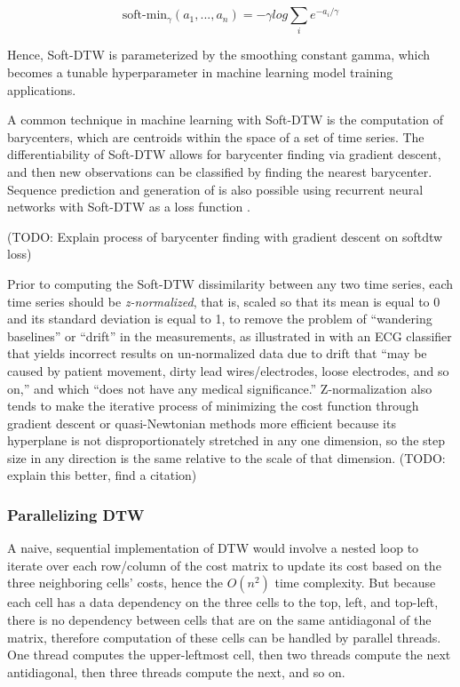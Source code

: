 \documentclass[12pt, letterpaper]{article}
\begin{document}
\begin{equation} \label{softdtw}
\text{soft-min}_\gamma(a_1,...,a_n) = -\gamma log\sum_{i}e^{-a_i/\gamma}
\end{equation}

Hence, Soft-DTW is parameterized by the smoothing constant gamma, which becomes
a tunable hyperparameter in machine learning model training applications.

A common technique in machine learning with Soft-DTW is the computation of
barycenters, which are centroids within the space of a set of time series. The
differentiability of Soft-DTW allows for barycenter finding via gradient
descent, and then new observations can be classified by finding the nearest
barycenter. Sequence prediction and generation of is also possible using
recurrent neural networks with Soft-DTW as a loss function
\cite{cuturi_soft-dtw_2018}.

(TODO: Explain process of barycenter finding with gradient descent on softdtw
loss)

Prior to computing the Soft-DTW dissimilarity between any two time series, each
time series should be \emph{z-normalized}, that is, scaled so that its mean is
equal to 0 and its standard deviation is equal to 1, to remove the problem of
``wandering baselines'' or ``drift'' in the measurements, as illustrated in
\cite{rakthanmanon_addressing_2013} with an ECG classifier that yields incorrect
results on un-normalized data due to drift that ``may be caused by patient
movement, dirty lead wires/electrodes, loose electrodes, and so on,'' and which
``does not have any medical significance.'' Z-normalization also tends to make
the iterative process of minimizing the cost function through gradient descent
or quasi-Newtonian methods more efficient because its hyperplane is not
disproportionately stretched in any one dimension, so the step size in any
direction is the same relative to the scale of that dimension. (TODO: explain
this better, find a citation)

\subsubsection{Parallelizing DTW}

A naive, sequential implementation of DTW would involve a nested loop to iterate
over each row/column of the cost matrix to update its cost based on the three
neighboring cells' costs, hence the $O(n^2)$ time complexity. But because each
cell has a data dependency on the three cells to the top, left, and top-left,
there is no dependency between cells that are on the same antidiagonal of
the matrix, therefore computation of these cells can be handled by parallel
threads. One thread computes the upper-leftmost cell, then two threads compute
the next antidiagonal, then three threads compute the next, and so on.
\end{document}
